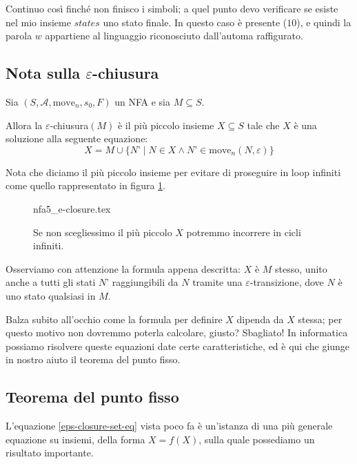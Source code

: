 \documentclass[class=book, crop=false, oneside, 12pt]{standalone}
\begin{document}
Continuo così finché non finisco i simboli; a quel punto devo verificare se esiste nel mio insieme \(states\) uno stato finale. In questo caso è presente (\(10\)), e quindi la parola \(w\) appartiene al linguaggio riconosciuto dall’automa raffigurato.


\subsection{Nota sulla \(\varepsilon\)-chiusura}
\begin{theorem}
    Sia \((S, \mathcal{A}, \textrm{move}_n, s_0, F)\) un NFA e sia \(M \subseteq S\).
    
    Allora la \(\varepsilon\)-chiusura\((M)\) è il più piccolo insieme \(X \subseteq S\) tale che \(X\) è una soluzione alla seguente equazione:
    \begin{equation}
        X = M \cup \{ N’ \mid N \in X \land N’ \in \textrm{move}_n (N,\varepsilon)\}
        \label{eps-closure-set-eq}
    \end{equation}
\end{theorem}

\noindent Nota che diciamo il più piccolo insieme per evitare di proseguire in loop infiniti come quello rappresentato in figura \ref{nfa_ciclico}.

\begin{figure}
    \centering
    {nfa5_e-closure.tex}
    \caption{Se non scegliessimo il più piccolo \(X\) potremmo incorrere in cicli infiniti.}
    \label{nfa_ciclico}
\end{figure}

Osserviamo con attenzione la formula appena descritta: \(X\) è \(M\) stesso, unito anche a tutti gli stati \(N’\) raggiungibili da \(N\) tramite una \(\varepsilon\)-transizione, dove \(N\) è uno stato qualsiasi in \(M\).

Balza subito all'occhio come la formula per definire \(X\) dipenda da \(X\) stessa; per questo motivo non dovremmo poterla calcolare, giusto? 
Sbagliato! In informatica possiamo risolvere queste equazioni date certe caratteristiche, ed è qui che giunge in nostro aiuto il teorema del punto fisso. 


\subsection{Teorema del punto fisso}
L'equazione \ref{eps-closure-set-eq} vista poco fa è un'istanza di una più generale equazione su insiemi, della forma \(X = f(X)\), sulla quale possediamo un risultato importante.
\end{document}
